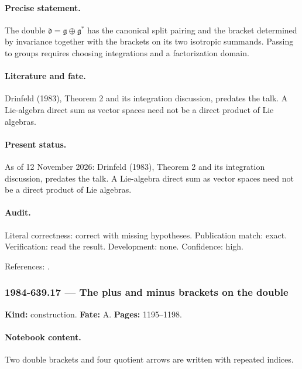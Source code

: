 \paragraph{Precise statement.} The double \(\mathfrak d=\mathfrak g\oplus\mathfrak g^*\) has the canonical split pairing and the bracket determined by invariance together with the brackets on its two isotropic summands. Passing to groups requires choosing integrations and a factorization domain.

\paragraph{Literature and fate.} Drinfeld (1983), Theorem 2 and its integration discussion, predates the talk. A Lie-algebra direct sum as vector spaces need not be a direct product of Lie algebras.

\paragraph{Present status.} As of 12 November 2026: Drinfeld (1983), Theorem 2 and its integration discussion, predates the talk. A Lie-algebra direct sum as vector spaces need not be a direct product of Lie algebras.

\paragraph{Audit.} Literal correctness: correct with missing hypotheses. Publication match: exact. Verification: read the result. Development: none. Confidence: high.

\noindent References: \citep{drinfeld1983hamiltonian}.\par

\subsubsection{1984-639.17 --- The plus and minus brackets on the double}

\label{item:1984-639.17}

\noindent\textbf{Kind:} construction. \textbf{Fate:} A. \textbf{Pages:} 1195--1198.\par

\paragraph{Notebook content.} Two double brackets and four quotient arrows are written with repeated indices.

